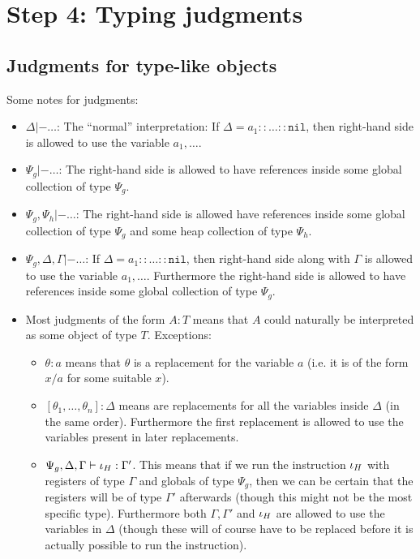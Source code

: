 \section{Step 4: Typing judgments}
\subsection{Judgments for type-like objects}

Some notes for judgments:

\begin{itemize}
\item $\Delta |- \dots$: The ``normal'' interpretation: If
  $\Delta = a_1 :: \dots :: \mathtt{nil}$, then right-hand side is allowed to
  use the variable $a_1, \dots$.
\item $\Psi_g |- \dots$: The right-hand side is allowed to have references
  inside some global collection of type $\Psi_g$.
\item $\Psi_g, \Psi_h |- \dots$: The right-hand side is allowed have references
  inside some global collection of type $\Psi_g$ and some heap collection of
  type $\Psi_h$.
\item $\Psi_g, \Delta, \Gamma |- \dots$: If
  $\Delta = a_1 :: \dots :: \mathtt{nil}$, then right-hand side along with
  $\Gamma$ is allowed to use the variable $a_1, \dots$. Furthermore the
  right-hand side is allowed to have references inside some global collection of
  type $\Psi_g$.
\item Most judgments of the form $A : T$ means that $A$ could naturally be
  interpreted as some object of type $T$. Exceptions:
  \begin{itemize}
  \item $\theta : a$ means that $\theta$ is a replacement for the variable $a$
    (i.e. it is of the form $x / a$ for some suitable $x$).
  \item $[\theta_1, \dots, \theta_n] : \Delta$ means are replacements for all
    the variables inside $\Delta$ (in the same order). Furthermore the first
    replacement is allowed to use the variables present in later replacements.
  \item $\Psi_g, \Delta, \Gamma |- {\iota_H} : \Gamma'$. This means that if
    we run the instruction ${\iota_H}$ with registers of type $\Gamma$ and
    globals of type $\Psi_g$, then we can be certain that the registers will be
    of type $\Gamma'$ afterwards (though this might not be the most specific
    type). Furthermore both $\Gamma, \Gamma'$ and ${\iota_H}$ are allowed to
    use the variables in $\Delta$ (though these will of course have to be
    replaced before it is actually possible to run the instruction).
  \end{itemize}
\end{itemize}

